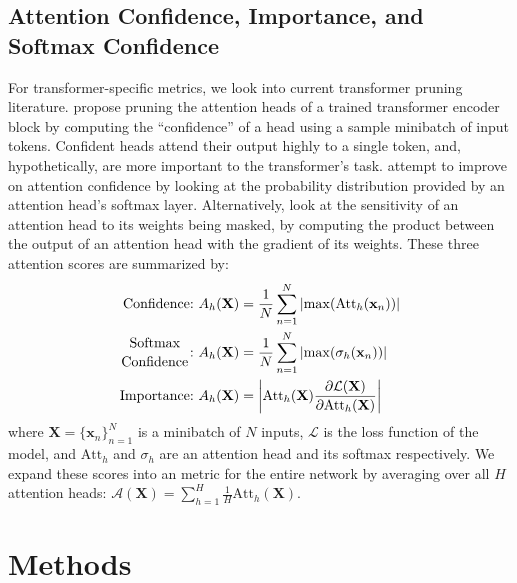 \documentclass[11pt]{article}
\begin{document}
\subsection{Attention Confidence, Importance, and Softmax Confidence}
    For transformer-specific metrics, we look into current transformer pruning literature. \citet{voita_analyzing_2019} propose pruning the attention heads of a trained transformer encoder block by computing the ``confidence'' of a head using a sample minibatch of input tokens. Confident heads attend their output highly to a single token, and, hypothetically, are more important to the transformer's task. \citet{behnke_losing_2020} attempt to improve on attention confidence by looking at the probability distribution provided by an attention head's softmax layer. Alternatively, \citet{michel_are_2019} look at the sensitivity of an attention head to its weights being masked, by computing the product between the output of an attention head with the gradient of its weights. These three attention scores are summarized by:
    \begin{align*}
        \text{Confidence:}\ A_h(\mathbf{X}) &= \frac{1}{N}\sum_{n=1}^N\left|\max(\text{Att}_h(\mathbf{x}_n))\right| \\
        \genfrac{}{}{0pt}{}{\text{Softmax}}{\text{Confidence}}\text{:}\ A_h(\mathbf{X}) &= \frac{1}{N}\sum_{n=1}^N\left|\max(\sigma_h(\mathbf{x}_n))\right| \\
        \text{Importance:}\ A_h(\mathbf{X}) &= \left|\text{Att}_h(\mathbf{X})\frac{\partial\mathcal{L}(\mathbf{X})}{\partial\text{Att}_h(\mathbf{X})}\right|
    \end{align*}
    where $\mathbf{X} = \{\mathbf{x}_n\}_{n=1}^N$ is a minibatch of $N$ inputs, $\mathcal{L}$ is the loss function of the model, and $\text{Att}_h$ and $\sigma_h$ are an attention head and its softmax respectively. We expand these scores into an metric for the entire network by averaging over all $H$ attention heads: $\mathcal{A}(\mathbf{X}) = \sum_{h=1}^H\frac{1}{H}\text{Att}_h(\mathbf{X})$.


\section{Methods}
\end{document}

